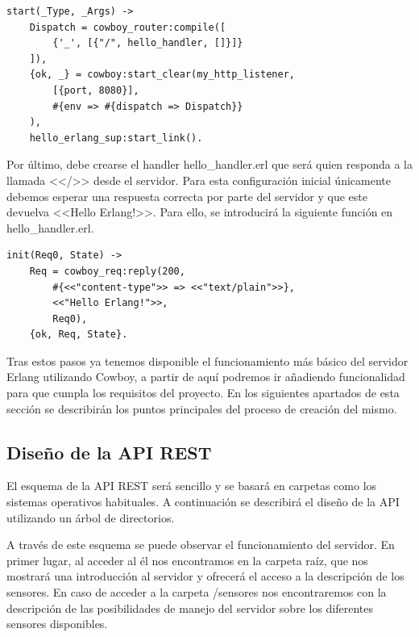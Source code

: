 \lstset{language=Erlang, breaklines=true, basicstyle=\sffamily\footnotesize}
\begin{lstlisting}[frame=single]
start(_Type, _Args) ->
    Dispatch = cowboy_router:compile([
        {'_', [{"/", hello_handler, []}]}
    ]),
    {ok, _} = cowboy:start_clear(my_http_listener,
        [{port, 8080}],
        #{env => #{dispatch => Dispatch}}
    ),
    hello_erlang_sup:start_link().
\end{lstlisting}

Por último, debe crearse el handler hello\_handler.erl que será quien responda a la llamada <</>> desde el servidor. Para esta configuración inicial únicamente debemos esperar una respuesta correcta por parte del servidor y que este devuelva <<Hello Erlang!>>. Para ello, se introducirá la siguiente función en hello\_handler.erl.\\

\lstset{language=Erlang, breaklines=true, basicstyle=\sffamily\footnotesize}
\begin{lstlisting}[frame=single]
init(Req0, State) ->
    Req = cowboy_req:reply(200,
        #{<<"content-type">> => <<"text/plain">>},
        <<"Hello Erlang!">>,
        Req0),
    {ok, Req, State}.
\end{lstlisting}

Tras estos pasos ya tenemos disponible el funcionamiento más básico del servidor Erlang utilizando Cowboy, a partir de aquí podremos ir añadiendo funcionalidad para que cumpla los requisitos del proyecto. En los siguientes apartados de esta sección se describirán los puntos principales del proceso de creación del mismo.

\subsection{Diseño de la API REST}

El esquema de la API REST será sencillo y se basará en carpetas como los sistemas operativos habituales. A continuación se describirá el diseño de la API utilizando un árbol de directorios.\\


A través de este esquema se puede observar el funcionamiento del servidor. En primer lugar, al acceder al él nos encontramos en la carpeta raíz, que nos mostrará una introducción al servidor y ofrecerá el acceso a la descripción de los sensores. En caso de acceder a la carpeta /sensores nos encontraremos con la descripción de las posibilidades de manejo del servidor sobre los diferentes sensores disponibles.

